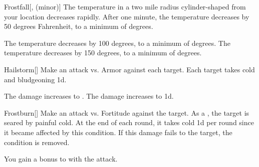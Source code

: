 \lowercase{\hypertarget{spell:Frostfall}{}}\label{spell:Frostfall}
\begin{freeability}[Rank 4]{\hypertarget{spell:Frostfall}{Frostfall}}[,  (minor)]
\targetrule
The temperature in a two mile radius cylinder-shaped  from your location decreases rapidly.
After one minute, the temperature decreases by 50 degrees Fahrenheit, to a minimum of  degrees.

\rankline
{} The temperature decreases by 100 degrees, to a minimum of  degrees.
 The temperature decreases by 150 degrees, to a minimum of  degrees.
\end{freeability}
\vspace{0.25em}



\lowercase{\hypertarget{spell:Hailstorm}{}}\label{spell:Hailstorm}
\begin{freeability}[Rank 4]{\hypertarget{spell:Hailstorm}{Hailstorm}}[]
Make an attack vs. Armor against each target.
\hit Each target takes cold and bludgeoning  \minus1d.

\rankline
{} The damage increases to .
 The damage increases to  \plus1d.
\end{freeability}
\vspace{0.25em}



\lowercase{\hypertarget{spell:Frostburn}{}}\label{spell:Frostburn}
\begin{freeability}[Rank 6]{\hypertarget{spell:Frostburn}{Frostburn}}[]
Make an attack vs. Fortitude against the target.
\hit As a , the target is seared by painful cold.
At the end of each round, it takes cold  \minus1d per round since it became affected by this condition.
If this damage fails to  the target, the condition is removed.

 You gain a  bonus to  with the attack.
\end{freeability}
\vspace{0.25em}


